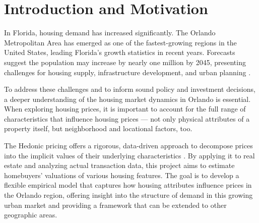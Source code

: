 \section*{Introduction and Motivation}

In Florida, housing demand has increased significantly. The Orlando Metropolitan Area has emerged as one of the fastest-growing regions in the United States, leading Florida’s growth statistics in recent years. Forecasts suggest the population may increase by nearly one million by 2045, presenting challenges for housing supply, infrastructure development, and urban planning \citep{bebr:2023}. 

To address these challenges and to inform sound policy and investment decisions, a deeper understanding of the housing market dynamics in Orlando is essential. When exploring housing prices, it is important to account for the full range of characteristics that influence housing prices --- not only physical attributes of a property itself, but neighborhood and locational factors, too.

The Hedonic pricing offers a rigorous, data-driven approach to decompose prices into the implicit values of their underlying characteristics \citep{rosen:1974}. By applying it to real estate and analyzing actual transaction data, this project aims to estimate homebuyers’ valuations of various housing features. The goal is to develop a flexible empirical model that captures how housing attributes influence prices in the Orlando region, offering insight into the structure of demand in this growing urban market and providing a framework that can be extended to other geographic areas.
